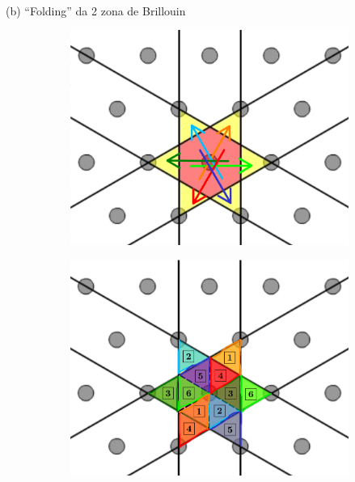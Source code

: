 \documentclass[aspectratio=169]{beamer}
\begin{document}


\begin{frame}{(b) ``Folding'' da 2\textsuperscript{} zona de Brillouin}

\begin{figure}[H]
\centering
\begin{subfigure}{.45\textwidth}
  \centering
  \includegraphics[width=\linewidth]{fig/2nd_bz-folding_1.png}
\end{subfigure}%
\quad \quad
\begin{subfigure}{.45\textwidth}
  \centering
  \includegraphics[width=\linewidth]{fig/2nd_bz-folding_2.png}
\end{subfigure}
\end{figure}

\end{frame}
\end{document}
